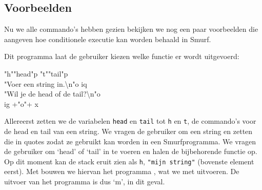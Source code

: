 \subsection{Voorbeelden}
\label{sec:intro:exmp}
Nu we alle commando's hebben gezien bekijken we nog een paar voorbeelden die
aangeven hoe conditionele executie kan worden behaald in Smurf.

%
%

\begin{exmp}
	Dit programma laat de gebruiker kiezen welke functie er wordt uitgevoerd:
	\begin{smurf}
		"h""head"p "t""tail"p \\
		"Voer een string in.\textbackslash{}n"o iq \\
		"Wil je de head of de tail?\textbackslash{}n"o \\
		ig +"o"+ x
	\end{smurf}
	Allereerst zetten we de variabelen \verb$head$ en \verb$tail$ tot \verb$h$ en
	\verb$t$, de commando's voor de head en tail van een string. We vragen de
	gebruiker om een string en zetten die in quotes zodat ze gebruikt kan worden
	in een Smurfprogramma. We vragen de gebruiker om `head' of `tail' in te
	voeren en halen de bijbehorende functie op. Op dit moment kan de stack eruit
	zien als \verb$h$, \verb$"mijn string"$ (bovenste element eerst). Met
	 bouwen we hiervan het programma , wat we met  uitvoeren. De uitvoer van het
	programma is dus `m', in dit geval.
\end{exmp}

